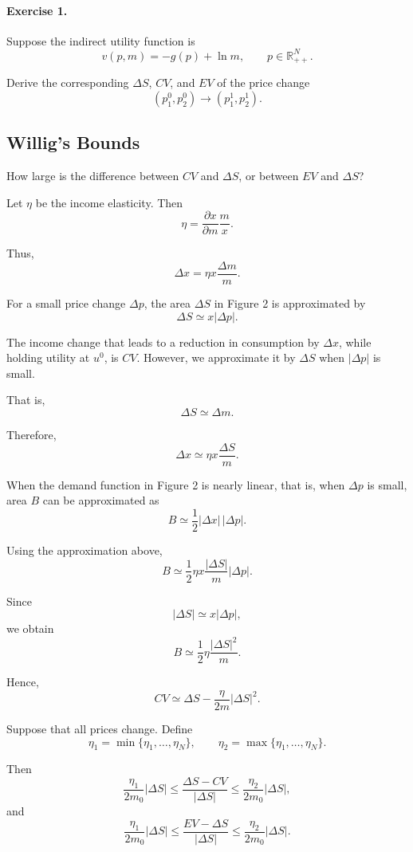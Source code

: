 \paragraph{Exercise 1.}
Suppose the indirect utility function is
\[
v(p,m)
=
-g(p)+\ln m,
\qquad
p\in \mathbb{R}_{++}^N.
\]

Derive the corresponding \(\Delta S\), \(CV\), and \(EV\) of the price change
\[
(p_1^0,p_2^0)
\to
(p_1^1,p_2^1).
\]

\subsection{Willig's Bounds}

How large is the difference between \(CV\) and \(\Delta S\), or between \(EV\) and \(\Delta S\)?

Let \(\eta\) be the income elasticity. Then
\[
\eta
=
\frac{\partial x}{\partial m}\frac{m}{x}.
\]

Thus,
\[
\Delta x
=
\eta x\frac{\Delta m}{m}.
\]

For a small price change \(\Delta p\), the area \(\Delta S\) in Figure 2 is approximated by
\[
\Delta S
\simeq
x|\Delta p|.
\]

The income change that leads to a reduction in consumption by \(\Delta x\), while holding utility at \(u^0\), is \(CV\). However, we approximate it by \(\Delta S\) when \(|\Delta p|\) is small.

That is,
\[
\Delta S\simeq \Delta m.
\]

Therefore,
\[
\Delta x
\simeq
\eta x\frac{\Delta S}{m}.
\]

When the demand function in Figure 2 is nearly linear, that is, when \(\Delta p\) is small, area \(B\) can be approximated as
\[
B
\simeq
\frac{1}{2}|\Delta x|\,|\Delta p|.
\]

Using the approximation above,
\[
B
\simeq
\frac{1}{2}
\eta x
\frac{|\Delta S|}{m}
|\Delta p|.
\]

Since
\[
|\Delta S|
\simeq
x|\Delta p|,
\]
we obtain
\[
B
\simeq
\frac{1}{2}
\eta
\frac{|\Delta S|^2}{m}.
\]

Hence,
\[
CV
\simeq
\Delta S
-
\frac{\eta}{2m}|\Delta S|^2.
\]

Suppose that all prices change. Define
\[
\eta_1=\min\{\eta_1,\dots,\eta_N\},
\qquad
\eta_2=\max\{\eta_1,\dots,\eta_N\}.
\]

Then
\[
\frac{\eta_1}{2m_0}|\Delta S|
\le
\frac{\Delta S-CV}{|\Delta S|}
\le
\frac{\eta_2}{2m_0}|\Delta S|,
\]
and
\[
\frac{\eta_1}{2m_0}|\Delta S|
\le
\frac{EV-\Delta S}{|\Delta S|}
\le
\frac{\eta_2}{2m_0}|\Delta S|.
\]

